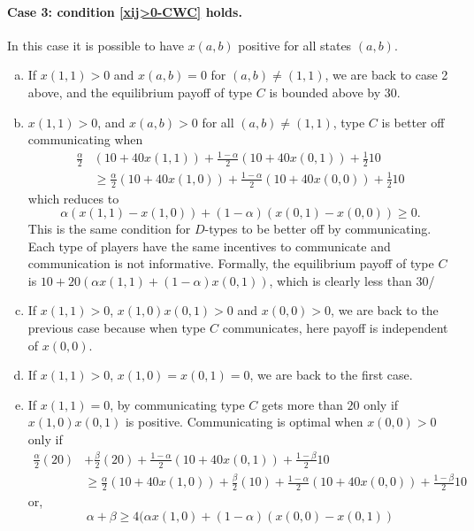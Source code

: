 \documentclass[12pt]{article}
\theoremstyle{break}
\begin{document}
\paragraph{Case 3: condition \eqref{xij>0-CWC} holds.} In this case it is possible to have $x(a,b)$ positive for all states $(a,b)$. 
\begin{enumerate}[(a)]
	\item If $x(1,1)>0$ and $x(a,b)=0$ for $(a,b)\neq (1,1)$, we are back to case 2 above, and the equilibrium payoff of type $C$ is bounded above by $30$.
	\item $x(1,1)>0$, and $x(a,b)>0$ for all $(a,b)\neq (1,1)$, type $C$ is better off communicating when
	\begin{equation*}
		\begin{split}
		\frac{\alpha}{2}& (10+40x(1,1))+\frac{1-\alpha}{2}(10+40x(0,1))+\frac{1}{2}10\\ 
		&\geq \frac{\alpha}{2} (10+40x(1,0))+\frac{1-\alpha}{2}(10+40x(0,0))+\frac{1}{2}10
		\end{split}
	\end{equation*} 
	which reduces to
	\begin{equation*}
		\alpha (x(1,1)-x(1,0))+(1-\alpha)(x(0,1)-x(0,0))\geq 0.
	\end{equation*}
	This is the same condition for $D$-types to be better off by communicating. Each type of players have the same incentives to communicate and communication is not informative. Formally, the equilibrium payoff of type $C$ is $10+20(\alpha x(1,1)+(1-\alpha)x(0,1))$, which is clearly less than $30$/
	\item If $x(1,1)>0$, $x(1,0)x(0,1)>0$ and $x(0,0)>0$, we are back to the previous case because when type $C$ communicates, here payoff is independent of $x(0,0)$.
	\item If $x(1,1)>0$, $x(1,0)=x(0,1)=0$, we are back to the first case.
	\item If $x(1,1)=0$, by communicating type $C$ gets more than $20$ only if $x(1,0)x(0,1)$ is positive. Communicating is optimal when $x(0,0)>0$ only if
	\begin{align*}
		\frac{\alpha}{2} (20)&+\frac{\beta}{2}(20)+\frac{1-\alpha}{2}(10+40x(0,1))+\frac{1-\beta}{2}10\\ 
		&\geq \frac{\alpha}{2}(10+40x(1,0)) +\frac{\beta}{2}(10)+\frac{1-\alpha}{2}(10+40x(0,0))+\frac{1-\beta}{2}10
	\end{align*}
	or,
\begin{equation}\label{icc}
\alpha+\beta \geq 4 (\alpha x(1,0)+(1-\alpha)(x(0,0)-x(0,1))

\end{equation}
\end{enumerate}
\end{document}
